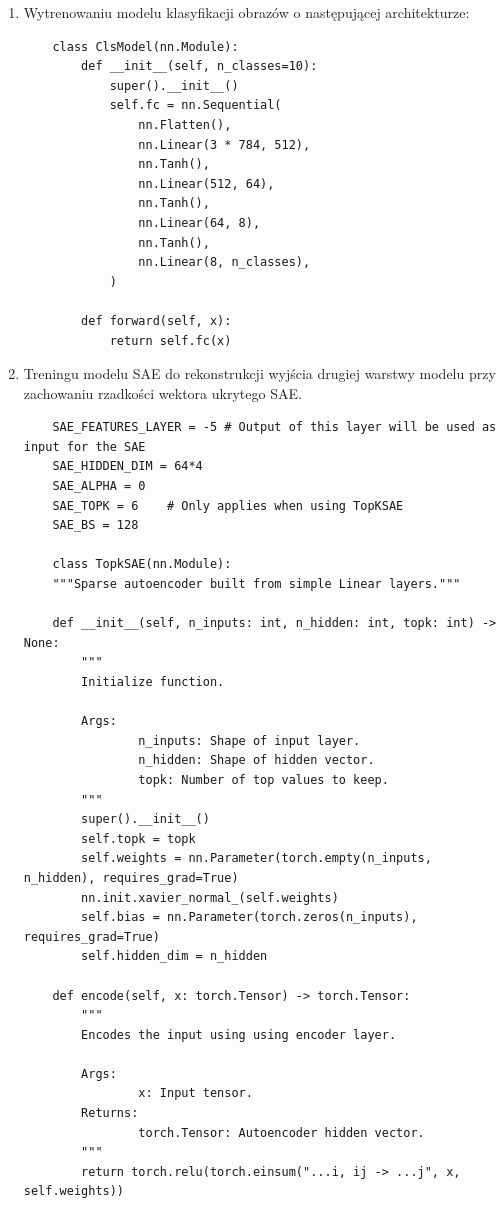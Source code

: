 \begin{enumerate}
\item   Wytrenowaniu modelu klasyfikacji obrazów o następującej architekturze:

\begin{small}
\begin{verbatim}
    class ClsModel(nn.Module):
        def __init__(self, n_classes=10):
            super().__init__()
            self.fc = nn.Sequential(
                nn.Flatten(),
                nn.Linear(3 * 784, 512),
                nn.Tanh(),
                nn.Linear(512, 64),
                nn.Tanh(),
                nn.Linear(64, 8),
                nn.Tanh(),
                nn.Linear(8, n_classes),
            )

        def forward(self, x):
            return self.fc(x)
\end{verbatim}
\end{small}

\item   Treningu modelu SAE do rekonstrukcji wyjścia drugiej warstwy modelu przy zachowaniu rzadkości wektora ukrytego SAE.
\begin{small}
\begin{verbatim}
    SAE_FEATURES_LAYER = -5	# Output of this layer will be used as input for the SAE
    SAE_HIDDEN_DIM = 64*4
    SAE_ALPHA = 0
    SAE_TOPK = 6    # Only applies when using TopKSAE
    SAE_BS = 128

    class TopkSAE(nn.Module):
    """Sparse autoencoder built from simple Linear layers."""

    def __init__(self, n_inputs: int, n_hidden: int, topk: int) -> None:
        """
        Initialize function.

        Args:
                n_inputs: Shape of input layer.
                n_hidden: Shape of hidden vector.
                topk: Number of top values to keep.
        """
        super().__init__()
        self.topk = topk
        self.weights = nn.Parameter(torch.empty(n_inputs, n_hidden), requires_grad=True)
        nn.init.xavier_normal_(self.weights)
        self.bias = nn.Parameter(torch.zeros(n_inputs), requires_grad=True)
        self.hidden_dim = n_hidden

    def encode(self, x: torch.Tensor) -> torch.Tensor:
        """
        Encodes the input using using encoder layer.

        Args:
                x: Input tensor.
        Returns:
                torch.Tensor: Autoencoder hidden vector.
        """
        return torch.relu(torch.einsum("...i, ij -> ...j", x, self.weights))


\end{verbatim}
\end{small}
\end{enumerate}
